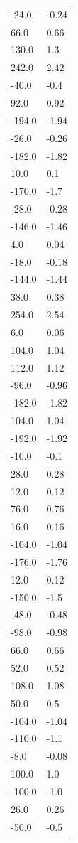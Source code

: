 \begin{longtable}{ll}
-24.0 & -0.24 \\
66.0 & 0.66 \\
130.0 & 1.3 \\
242.0 & 2.42 \\
-40.0 & -0.4 \\
92.0 & 0.92 \\
-194.0 & -1.94 \\
-26.0 & -0.26 \\
-182.0 & -1.82 \\
10.0 & 0.1 \\
-170.0 & -1.7 \\
-28.0 & -0.28 \\
-146.0 & -1.46 \\
4.0 & 0.04 \\
-18.0 & -0.18 \\
-144.0 & -1.44 \\
38.0 & 0.38 \\
254.0 & 2.54 \\
6.0 & 0.06 \\
104.0 & 1.04 \\
112.0 & 1.12 \\
-96.0 & -0.96 \\
-182.0 & -1.82 \\
104.0 & 1.04 \\
-192.0 & -1.92 \\
-10.0 & -0.1 \\
28.0 & 0.28 \\
12.0 & 0.12 \\
76.0 & 0.76 \\
16.0 & 0.16 \\
-104.0 & -1.04 \\
-176.0 & -1.76 \\
12.0 & 0.12 \\
-150.0 & -1.5 \\
-48.0 & -0.48 \\
-98.0 & -0.98 \\
66.0 & 0.66 \\
52.0 & 0.52 \\
108.0 & 1.08 \\
50.0 & 0.5 \\
-104.0 & -1.04 \\
-110.0 & -1.1 \\
-8.0 & -0.08 \\
100.0 & 1.0 \\
-100.0 & -1.0 \\
26.0 & 0.26 \\
-50.0 & -0.5 \\

\end{longtable}
